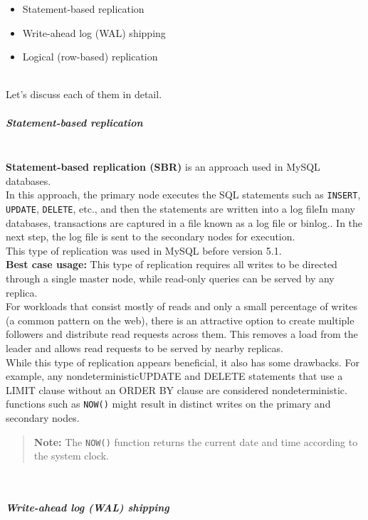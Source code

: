 \begin{itemize}
\item
\protect{}\label{SQk2F7m0y2VRKmWv_aFzN}
Statement-based replication
\item
\protect{}\label{IVpHtZ0N8fKS7qDmY9txZ}
Write-ahead log (WAL) shipping
\item
\protect{}\label{tsWl6D2xvmWWgIDayO94J}
Logical (row-based) replication
\end{itemize}
\\
Let's discuss each of them in detail.
\\
\subparagraph{Statement-based replication}\label{SUlp5J4jYvphLodGn3MiU}
\\
\textbf{Statement-based replication (SBR)} is an approach used in MySQL databases.
\\
In this approach, the primary node executes the SQL statements such as \texttt{INSERT}, \texttt{UPDATE}, \texttt{DELETE}, etc., and then the statements are written into a log fileIn many databases, transactions are captured in a file known as a log file or binlog.. In the next step, the log file is sent to the secondary nodes for execution.
\\
This type of replication was used in MySQL before version 5.1.
\\
\textbf{Best case usage:} This type of replication requires all writes to be directed through a single master node, while read-only queries can be served by any replica.
\\
For workloads that consist mostly of reads and only a small percentage of writes (a common pattern on the web), there is an attractive option to create multiple followers and distribute read requests across them. This removes a load from the leader and allows read requests to be served by nearby replicas.
\\
While this type of replication appears beneficial, it also has some drawbacks. For example, any nondeterministicUPDATE and DELETE statements that use a LIMIT clause without an ORDER BY clause are considered nondeterministic. functions such as \texttt{NOW()} might result in distinct writes on the primary and secondary nodes.
\begin{quote}
\textbf{Note:} The \texttt{NOW()} function returns the current date and time according to the system clock.
\end{quote}
\\
\subparagraph{Write-ahead log (WAL) shipping}\label{WxQCtPSGOZlG5JaJndrqZ}
\\
